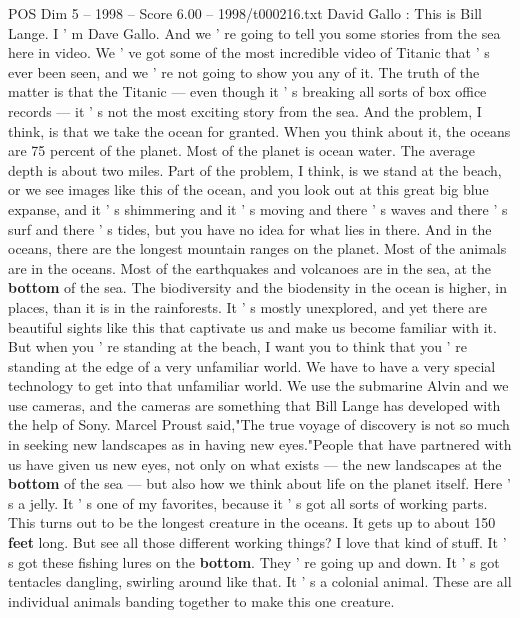 \begin{textsample}{POS Dim 5 – 1998 – Score 6.00 – 1998/t000216.txt}  \label{ex:f5_pos_010}
David Gallo : This is Bill Lange.
I ' m Dave Gallo.
And we ' re going to tell you some stories from the sea here in video.
We ' ve got some of the most incredible video of Titanic that ' s ever been seen, and we ' re not going to show you any of it.
The truth of the matter is that the Titanic — even though it ' s breaking all sorts of box office records — it ' s not the most exciting story from the sea.
And the problem, I think, is that we take the ocean for granted.
When you think about it, the oceans are 75 percent of the planet.
Most of the planet is ocean water.
The average depth is about two miles.
Part of the problem, I think, is we stand at the beach, or we see images like this of the ocean, and you look out at this great big blue expanse, and it ' s shimmering and it ' s moving and there ' s waves and there ' s surf and there ' s tides, but you have no idea for what lies in there.
And in the oceans, there are the longest mountain ranges on the planet.
Most of the animals are in the oceans.
Most of the earthquakes and volcanoes are in the sea, at the \textbf{bottom} of the sea.
The biodiversity and the biodensity in the ocean is higher, in places, than it is in the rainforests.
It ' s mostly unexplored, and yet there are beautiful sights like this that captivate us and make us become familiar with it.
But when you ' re standing at the beach, I want you to think that you ' re standing at the edge of a very unfamiliar world.
We have to have a very special technology to get into that unfamiliar world.
We use the submarine Alvin and we use cameras, and the cameras are something that Bill Lange has developed with the help of Sony.
Marcel Proust said,"The true voyage of discovery is not so much in seeking new landscapes as in having new eyes."People that have partnered with us have given us new eyes, not only on what exists — the new landscapes at the \textbf{bottom} of the sea — but also how we think about life on the planet itself.
Here ' s a jelly.
It ' s one of my favorites, because it ' s got all sorts of working parts.
This turns out to be the longest creature in the oceans.
It gets up to about 150 \textbf{feet} long.
But see all those different working things?
I love that kind of stuff.
It ' s got these fishing lures on the \textbf{bottom}.
They ' re going up and down.
It ' s got tentacles dangling, swirling around like that.
It ' s a colonial animal.
These are all individual animals banding together to make this one creature.

\end{textsample}

